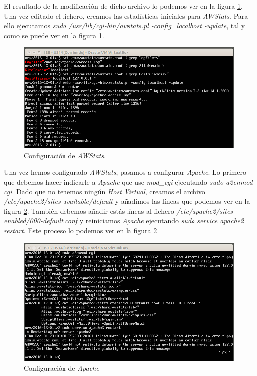 \documentclass[a4paper,titlepage,12pt]{scrartcl}	%
\numberwithin{figure}{section} %
\numberwithin{table}{section} %
\begin{document}
	El resultado de la modificación de dicho archivo lo podemos ver en la figura \ref{O6-1}. Una vez editado el fichero, creamos las estadísticas iniciales para \textit{AWStats}. Para ello ejecutamos \textit{sudo /usr/lib/cgi-bin/awstats.pl -config=localhost -update}, tal y como se puede ver en la figura \ref{O6-1}.
	
	\begin{figure}[H]
		\includegraphics[width=\linewidth]{./Imagenes/O6-1.png}
		\vspace{-0.5cm}
		\caption[Configuración de \textit{AWStats}.]{Configuración de \textit{AWStats}.}
		\label{O6-1}
	\end{figure}
	
	Una vez hemos configurado \textit{AWStats}, pasamos a configurar \textit{Apache}. Lo primero que debemos hacer indicarle a \textit{Apache} que use \textit{mod\_cgi} ejecutando \textit{sudo a2enmod cgi}. Dado que no tenemos ningún \textit{Host Virtual}, creamos el archivo \textit{/etc/apache2/sites-available/default} y añadimos las líneas que podemos ver en la figura \ref{O6-2}. También debemos añadir estás líneas al fichero \textit{/etc/apache2/sites-enabled/000-default.conf} y reiniciamos \textit{Apache} ejecutando \textit{sudo service apache2 restart}. Este proceso lo podemos ver en la figura \ref{O6-2}
	
	\begin{figure}[H]
		\centering
		\includegraphics[scale=0.5]{./Imagenes/O6-2.png}
		\caption[Configuración de \textit{Apache}.]{Configuración de \textit{Apache}}
		\label{O6-2}
	\end{figure}
	
\end{document}
